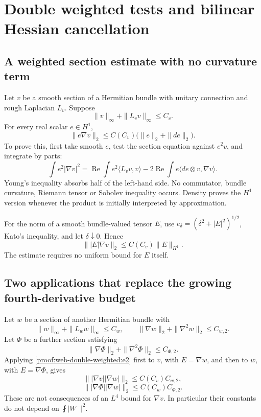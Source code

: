 \section{Double weighted tests and bilinear Hessian cancellation}
\label{sec:web-double-weighted}
\hypertarget{proof:web-double-weighted:s1}{%
\subsection{A weighted section estimate with no curvature term}\label{proof:web-double-weighted:s1}}

Let \(v\) be a smooth section of a Hermitian bundle with unitary connection and rough Laplacian \(L_v\). Suppose \[
\|v\|_\infty+\|L_vv\|_\infty\le C_v.
\] For every real scalar \(e\in H^1\), \[
\boxed{
\|e\nabla v\|_2
\le C(C_v)\bigl(\|e\|_2+\|de\|_2\bigr).
}
\tag{\thesection.1}\label{proof:web-double-weighted:e1}
\] To prove this, first take smooth \(e\), test the section equation against \(e^2v\), and integrate by parts: \[
\int e^2|\nabla v|^2
=\operatorname{Re}\int e^2\langle L_vv,v\rangle
-2\operatorname{Re}\int e\langle de\otimes v,\nabla v\rangle.
\] Young's inequality absorbs half of the left-hand side. No commutator, bundle curvature, Riemann tensor or Sobolev inequality occurs. Density proves the \(H^1\) version whenever the product is initially interpreted by approximation.

For the norm of a smooth bundle-valued tensor \(E\), use \(e_\delta=(\delta^2+|E|^2)^{1/2}\), Kato's inequality, and let \(\delta\downarrow0\). Hence \[
\boxed{
\||E|\nabla v\|_2\le C(C_v)\|E\|_{H^1}.
}
\tag{\thesection.2}\label{proof:web-double-weighted:e2}
\] The estimate requires no uniform bound for \(E\) itself.

\hypertarget{proof:web-double-weighted:s2}{%
\subsection{Two applications that replace the growing fourth-derivative budget}\label{proof:web-double-weighted:s2}}

Let \(w\) be a section of another Hermitian bundle with \[
\|w\|_\infty+\|L_ww\|_\infty\le C_w,
\qquad \|\nabla w\|_2+\|\nabla^2w\|_2\le C_{w,2}.
\] Let \(\Phi\) be a further section satisfying \[
\|\nabla\Phi\|_2+\|\nabla^2\Phi\|_2\le C_{\Phi,2}.
\] Applying \eqref{proof:web-double-weighted:e2} first to \(v\), with \(E=\nabla w\), and then to \(w\), with \(E=\nabla\Phi\), gives \[
\boxed{
\||\nabla v||\nabla w|\|_2
\le C(C_v)C_{w,2},
}
\tag{\thesection.3}\label{proof:web-double-weighted:e3}
\] \[
\boxed{
\||\nabla\Phi||\nabla w|\|_2
\le C(C_w)C_{\Phi,2}.
}
\tag{\thesection.4}\label{proof:web-double-weighted:e4}
\] These are not consequences of an \(L^4\) bound for \(\nabla v\). In particular their constants do not depend on \(\fint|W^-|^2\).

